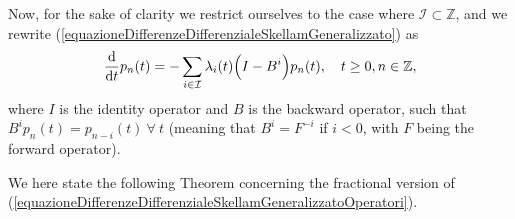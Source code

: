 \documentclass[12pt, twoside, english, headsepline]{article}
\newcommand*\dif{\mathop{}\!\mathrm{d}}  %
\theoremstyle{definition} %
\numberwithin{equation}{section} %
\begin{document}
Now, for the sake of clarity we restrict ourselves to the case where $\mathcal{I}\subset \mathbb{Z}$, and we rewrite (\ref{equazioneDifferenzeDifferenzialeSkellamGeneralizzato}) as
\begin{equation}\label{equazioneDifferenzeDifferenzialeSkellamGeneralizzatoOperatori}
  \frac{\dif }{\dif t} p_n(t)= -\sum_{i\in\mathcal{I}} \lambda_i(t) \Bigl(I-B^i\Bigr) p_n(t), \ \ \ t \ge0, n\in \mathbb{Z},
\end{equation}
where $I$ is the identity operator and $B$ is the backward operator, such that $B^i p_n(t) = p_{n-i}(t)\ \forall \ t$ (meaning that $B^i = F^{-i}$ if $i<0$, with $F$ being the forward operator). 

We here state the following Theorem concerning the fractional version of (\ref{equazioneDifferenzeDifferenzialeSkellamGeneralizzatoOperatori}). 
\end{document}
